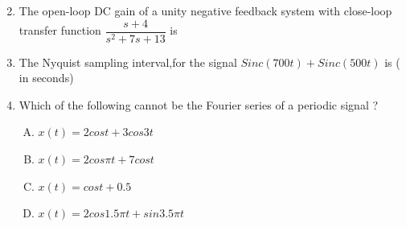 \documentclass[journal,12pt,twocolumn]{IEEEtran}
\begin{document}
\begin{enumerate}[1.]
\begin{enumerate}[(A)]
\begin{multicols}{4}
\end{multicols}
\end{enumerate}

\item The open-loop DC gain of a unity negative feedback system with close-loop transfer function $\dfrac{s+4}{s^{2}+7s+13}$ is\\
\begin{enumerate}[(A)]
\end{enumerate}

\item The Nyquist sampling interval,for the signal $Sinc(700t)+Sinc(500t)$ is ( in seconds)

\begin{enumerate}[(A)]
\end{enumerate}

\item Which of the following cannot be the Fourier series of a periodic signal ?\\
\begin{enumerate}[(A)]
\setlength\itemsep{1em}

\item $
x(t)=2cos t + 3 cos 3t
$
\item $
x(t)=2 cos \pi t+7 cos t
$
\item $
x(t)=cos t +0.5
$
\item $
x(t)=2 cos 1.5\pi t +sin 3.5 \pi t
$
\end{enumerate}


\end{enumerate}
\end{document}
